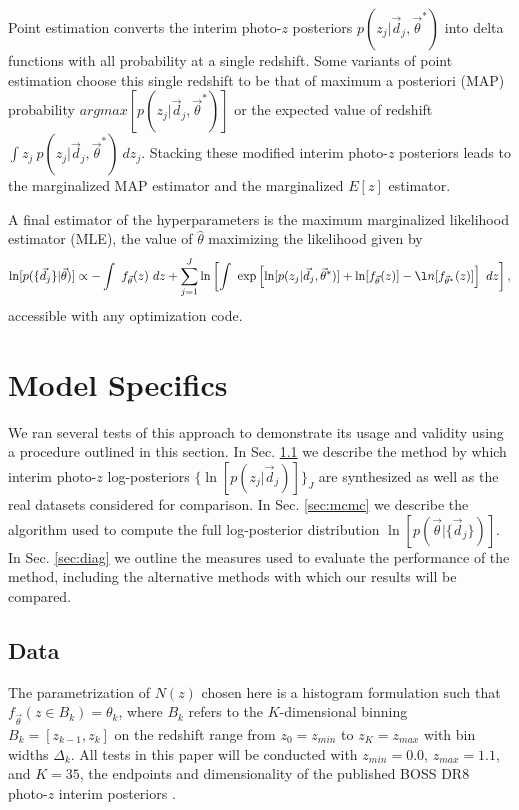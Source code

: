 \documentclass[preprint]{aastex}
\begin{document}
Point estimation converts the interim photo-$z$ posteriors 
$p(z_{j}|\vec{d}_{j},\vec{\theta}^{*})$ into delta functions with all 
probability at a single redshift.  Some variants of point estimation choose 
this single redshift to be that of maximum a posteriori (MAP) probability 
$argmax[p(z_{j}|\vec{d}_{j},\vec{\theta}^{*})]$ or the expected value of 
redshift $\int z_{j}\ p(z_{j}|\vec{d}_{j},\vec{\theta}^{*})\ dz_{j}$.  Stacking 
these modified interim photo-$z$ posteriors leads to the marginalized MAP 
estimator and the marginalized $E[z]$ estimator.

A final estimator of the hyperparameters is the maximum marginalized likelihood 
estimator (MLE), the value of $\hat{\theta}$ maximizing the likelihood given by 
\begin{equation}
\label{eq:mmle}
\ln[p(\{\vec{d}_{j}\}|\vec{\theta})] \propto -\int\ f_{\vec{\theta}}(z)\ 
dz+\sum_{j=1}^{J}\ln\left[\int\ 
\exp\left[\ln[p(z_{j}|\vec{d}_{j},\vec{\theta}^{*})]+\ln[f_{\vec{\theta}}(z)]-\l
n[f_{\vec{\theta}^{*}}(z)]\right]\ dz\right],
\end{equation}
accessible with any optimization code.

\section{Model Specifics}
\label{sec:exp}

We ran several tests of this approach to demonstrate its usage and validity 
using a procedure outlined in this section.  In Sec. \ref{sec:alldata} we 
describe the method by which interim photo-$z$ log-posteriors 
$\{\ln[p(z_{j}|\vec{d}_{j})]\}_{J}$ are synthesized as well as the real 
datasets considered for comparison.  In Sec. \ref{sec:mcmc} we describe the 
algorithm used to compute the full log-posterior distribution 
$\ln[p(\vec{\theta}|\{\vec{d}_{j}\})]$.  In Sec. \ref{sec:diag} we outline the 
measures used to evaluate the performance of the method, including the 
alternative methods with which our results will be compared.

\subsection{Data}
\label{sec:alldata}

The parametrization of $N(z)$ chosen here is a histogram formulation such that 
$f_{\vec{\theta}}(z\in B_{k})=\theta_{k}$, where $B_{k}$ refers to the 
$K$-dimensional binning $B_{k}=[z_{k-1},z_{k}]$ on the redshift range from 
$z_{0}=z_{min}$ to $z_{K}=z_{max}$ with bin widths $\Delta_{k}$.  All tests in 
this paper will be conducted with $z_{min}=0.0$, $z_{max}=1.1$, and $K=35$, the 
endpoints and dimensionality of the published BOSS DR8 photo-$z$ interim 
posteriors \citet{Sheldon2012}.
\end{document}
